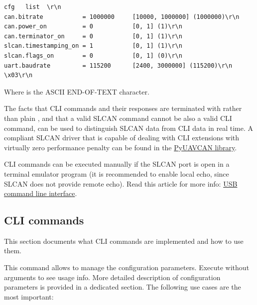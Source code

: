 \documentclass{zubaxdoc}
\begin{document}
\begin{verbatim}
cfg   list  \r\n
can.bitrate           = 1000000     [10000, 1000000] (1000000)\r\n
can.power_on          = 0           [0, 1] (1)\r\n
can.terminator_on     = 0           [0, 1] (1)\r\n
slcan.timestamping_on = 1           [0, 1] (1)\r\n
slcan.flags_on        = 0           [0, 1] (0)\r\n
uart.baudrate         = 115200      [2400, 3000000] (115200)\r\n
\x03\r\n
\end{verbatim}

Where  is the ASCII END-OF-TEXT character.

The facts that CLI commands and their responses are terminated with  rather than plain , and that a valid SLCAN command cannot be also a valid CLI command, can be used to distinguish SLCAN data from CLI data in real time. A compliant SLCAN driver that is capable of dealing with CLI extensions with virtually zero performance penalty can be found in the \href{http://uavcan.org/Implementations/Pyuavcan/}{PyUAVCAN library}.

CLI commands can be executed manually if the SLCAN port is open in a terminal emulator program (it is recommended to enable local echo, since SLCAN does not provide remote echo). Read this article for more info: \href{https://docs.zubax.com/usb}{USB command line interface}.
\clearpage

\subsection{CLI commands}

This section documents what CLI commands are implemented and how to use them.


This command allows to manage the configuration parameters. Execute without arguments to see usage info. More detailed description of configuration parameters is provided in a dedicated section. The following use cases are the most important:
\end{document}
